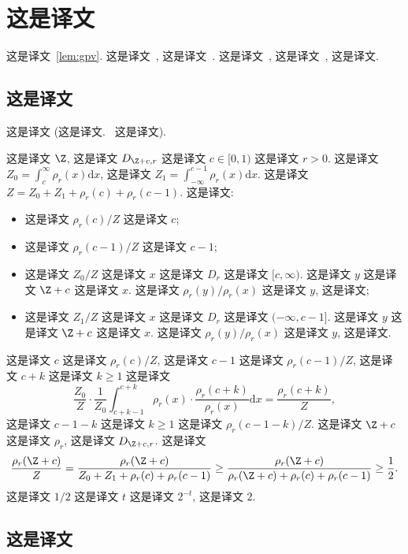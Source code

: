 \section{这是译文}
\label{sec:exactgpv}

这是译文~\ref{lem:gpv}.  这是译文~\cite{DBLP:conf/stoc/GentryPV08}, 这是译文~\cite{DBLP:conf/stoc/GentryPV08}. 这是译文~\cite{DBLP:conf/stoc/GentryPV08}, 这是译文~\cite{DBLP:conf/stoc/GentryPV08}, 这是译文. 

\subsection{这是译文}

这是译文 (这是译文.~\cite[Page 117]{DevroyeBook86} 这是译文).

这是译文 $\Z$, 这是译文 $D_{\Z+c,r}$ 这是译文 $c \in [0,1)$ 这是译文 $r>0$. 这是译文 $Z_0 = \int_c^\infty \rho_r(x) \mathrm{d} x$, 这是译文 $Z_1 = \int_{-\infty}^{c-1} \rho_r(x) \mathrm{d} x$. 这是译文 $Z=Z_0+Z_1+\rho_r(c)+\rho_r(c-1)$. 这是译文: 
\begin{itemize}
\item 这是译文 $\rho_r(c)/Z$ 这是译文 $c$;
\item 这是译文 $\rho_r(c-1)/Z$ 这是译文 $c-1$;
\item 这是译文 $Z_0/Z$ 这是译文 $x$ 这是译文 $D_r$ 这是译文 $[c,\infty)$. 这是译文 $y$ 这是译文 $\Z+c$ 这是译文 $x$. 这是译文 $\rho_r(y)/\rho_r(x)$ 这是译文 $y$, 这是译文;
\item 这是译文 $Z_1/Z$ 这是译文 $x$ 这是译文 $D_r$ 这是译文 $(-\infty,c-1]$. 这是译文 $y$ 这是译文 $\Z+c$ 这是译文 $x$. 这是译文 $\rho_r(y)/\rho_r(x)$ 这是译文 $y$, 这是译文.
\end{itemize}

这是译文 $c$ 这是译文 $\rho_r(c)/Z$, 这是译文 $c-1$  这是译文 $\rho_r(c-1)/Z$, 这是译文 $c+k$ 这是译文 $k \ge 1$ 这是译文 \[
\frac{Z_0}{Z} \cdot \frac{1}{Z_0} \int_{c+k-1}^{c+k} \rho_r(x) \cdot \frac{\rho_r(c+k)}{\rho_r(x)}  \mathrm{d} x
= \frac{\rho_r(c+k)}{Z},
\] 这是译文 $c-1-k$ 这是译文 $k \ge 1$ 这是译文  $\rho_r(c-1-k)/Z$. 这是译文 $\Z+c$ 这是译文 $\rho_r$, 这是译文 $D_{\Z+c,r}$. 这是译文 \[
\frac{\rho_r(\Z+c)}{Z} = \frac{\rho_r(\Z+c)}{Z_0+Z_1+\rho_r(c)+\rho_r(c-1)} \ge \frac{\rho_r(\Z+c)}{\rho_r(\Z+c)+\rho_r(c)+\rho_r(c-1)}
\ge \frac{1}{2}.
\] 这是译文 $1/2$ 这是译文 $t$ 这是译文 $2^{-t}$, 这是译文 $2$.

\subsection{这是译文}

